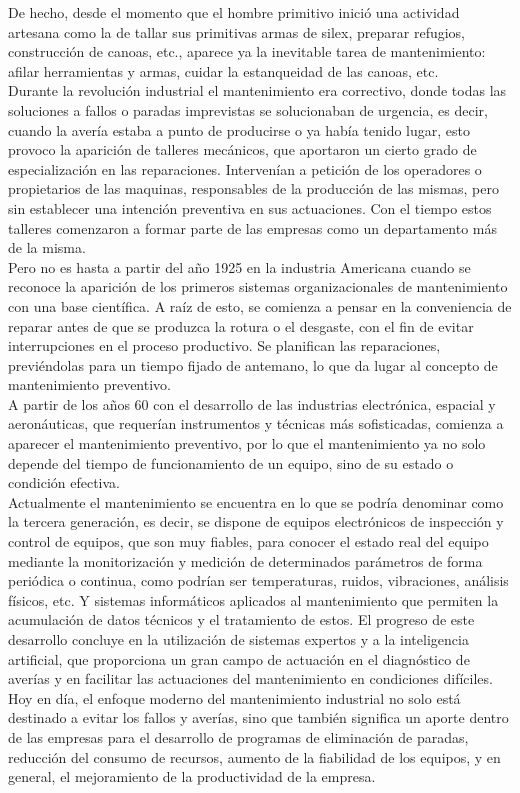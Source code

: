 \documentclass[runningheads,a4paper,12pt]{report}
\begin{document}
De hecho, desde el momento que el hombre primitivo inició una actividad artesana como la de tallar sus primitivas armas de silex, preparar refugios, construcción de canoas, etc., aparece ya la inevitable tarea de mantenimiento: afilar herramientas y armas, cuidar la estanqueidad de las canoas, etc. \\

 Durante la revolución industrial el mantenimiento era correctivo, donde todas las soluciones a fallos o paradas imprevistas se solucionaban de urgencia, es decir, cuando la avería estaba a punto de producirse o ya había tenido lugar, esto provoco la aparición de talleres mecánicos, que aportaron un cierto grado de especialización en las reparaciones. Intervenían a petición de los operadores o propietarios de las maquinas, responsables de la producción de las mismas, pero sin establecer una intención preventiva en sus actuaciones. Con el tiempo estos talleres comenzaron a formar parte de las empresas como un departamento más de la misma.  \\

 Pero no es hasta a partir del año 1925 en la industria Americana cuando se reconoce la aparición de los primeros sistemas organizacionales de mantenimiento con una base científica. A raíz de esto, se comienza a pensar en la conveniencia de reparar antes de que se produzca la rotura o el desgaste, con el fin de evitar interrupciones en el proceso productivo. Se planifican las reparaciones, previéndolas para un tiempo fijado de antemano, lo que da lugar al concepto de mantenimiento preventivo. \\

 A partir de los años 60 con el desarrollo de las industrias electrónica, espacial y aeronáuticas, que requerían instrumentos y técnicas más sofisticadas, comienza a aparecer el mantenimiento preventivo, por lo que el mantenimiento ya no solo depende del tiempo de funcionamiento de un equipo, sino de su estado o condición efectiva. \\

 Actualmente el mantenimiento se encuentra en lo que se podría denominar como la tercera generación, es decir, se dispone de equipos electrónicos de inspección y control de equipos, que son muy fiables, para conocer el estado real del equipo mediante la monitorización y medición de determinados parámetros de forma periódica o continua, como podrían ser temperaturas, ruidos, vibraciones, análisis físicos, etc. Y sistemas informáticos aplicados al mantenimiento que permiten la acumulación de datos técnicos y el tratamiento de estos. El progreso de este desarrollo concluye en la utilización de sistemas expertos y a la inteligencia artificial, que proporciona un gran campo de actuación en el diagnóstico de averías y en facilitar las actuaciones del mantenimiento en condiciones difíciles. Hoy en día, el enfoque moderno del mantenimiento industrial no solo está destinado a evitar los fallos y averías, sino que también significa un aporte dentro de las empresas para el desarrollo de programas de eliminación de paradas, reducción del consumo de recursos, aumento de la fiabilidad de los equipos, y en general, el mejoramiento de la productividad de la empresa. \\
\end{document}
